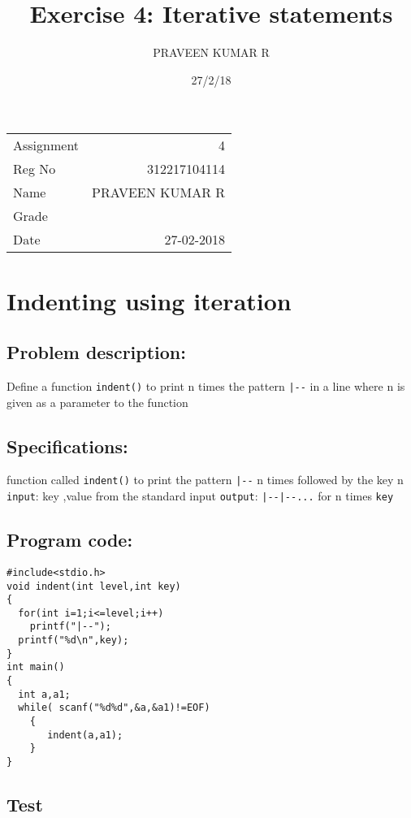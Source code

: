 \documentclass[11pt]{article}
\author{PRAVEEN KUMAR R}
\date{27/2/18}
\title{Exercise 4: Iterative statements}
\begin{document}
\maketitle
\begin{center}
\begin{tabular}{lr}
Assignment & 4\\
Reg No & 312217104114\\
Name & PRAVEEN KUMAR R\\
Grade & \\
Date & 27-02-2018\\
\end{tabular}
\end{center}
\begin{export}
\linespread{1.2}
\end{export}


\section{Indenting using iteration}
\label{sec-1}

\subsection*{Problem description:}
\label{sec-1-1}
Define a function \texttt{indent()} to print n times the pattern 
\texttt{|-{}-} in a line where n is given as a parameter to the function

\subsection*{Specifications:}
\label{sec-1-2}
function called \texttt{indent()} to print the pattern \texttt{|-{}-}
n times followed by the key n
\texttt{input}: key ,value from the standard input
\texttt{output}: \texttt{|-{}-|-{}-...} for n times \texttt{key}

\subsection*{Program code:}
\label{sec-1-3}

\begin{verbatim}
#include<stdio.h>
void indent(int level,int key)
{
  for(int i=1;i<=level;i++)
    printf("|--");
  printf("%d\n",key);
}
int main()
{
  int a,a1;
  while( scanf("%d%d",&a,&a1)!=EOF)
    {
       indent(a,a1);
    }
}
\end{verbatim}
\subsection*{Test}
\label{sec-1-4}
\end{document}

